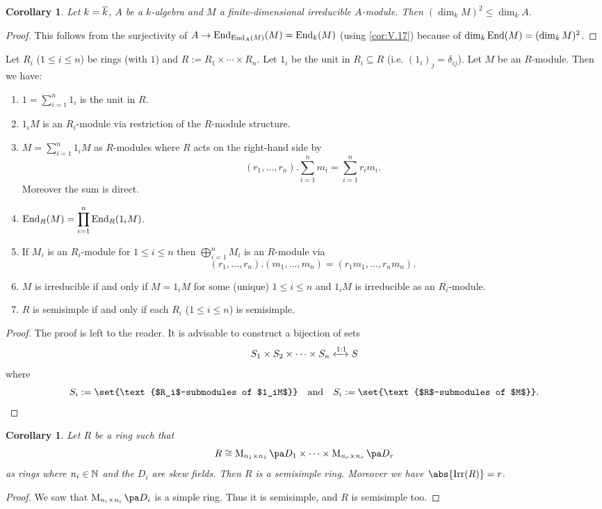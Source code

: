 \documentclass[12pt,a4paper]{scrartcl}
\theoremstyle{cplain}
\newtheorem{cor}[thmcounter]{Corollary}
\theoremstyle{cplain}
\theoremstyle{cplain}
\theoremstyle{definition}
\begin{document}
\begin{otherlanguage}{english}
\begin{cor} %
  Let $k=\overline k$, $A$ be a $k$-algebra and $M$ a finite-dimensional irreducible $A$-module. Then $(\dim_kM)^2 \le \dim_kA$.
\end{cor}
\begin{proof}
  This follows from the surjectivity of $A \to \operatorname{End}_{\operatorname{End}_{A}(M)}(M) = \operatorname{End}_k(M)$ (using \cref{cor:V.17}) because of $\dim_k\operatorname{End}(M) = (\dim_kM)^2$.
\end{proof}


\begin{lem} \label{lem:V.19} %
  Let $R_i$ ($1\le i\le n$) be rings (with $1$) and $R := R_1 \times \cdots \times R_n$. Let $1_i$ be the unit in $R_i \subseteq R$ (i.e. $(1_i)_j = \delta_{ij}$). Let $M$ be an $R$-module. Then we have:
  \begin{enumerate}
    \item $1 = \sum_{i=1}^n1_i$ is the unit in $R$.
    \item $1_iM$ is an $R_i$-module via restriction of the $R$-module structure.
    \item $M = \sum_{i=1}^n1_iM$ as $R$-modules where $R$ acts on the right-hand side by \[ (r_1,\ldots,r_n) . \sum_{i=1}^nm_i = \sum_{i=1}^nr_im_i. \] Moreover the sum is direct.
    \item \label{lem:V.19:4} $\displaystyle\operatorname{End}_R(M) = \prod_{i=1}^n \operatorname{End}_R(1_iM)$.
    \item If $M_i$ is an $R_i$-module for $1\le i\le n$ then $\bigoplus_{i=1}^n M_i$ is an $R$-module via \[(r_1,\ldots,r_n).(m_1,\ldots,m_n) = (r_1m_1,\ldots,r_nm_n).\]
    \item \label{lem:V.19:6} $M$ is irreducible if and only if $M = 1_iM$ for some (unique) $1\le i\le n$ and $1_iM$ is irreducible as an $R_i$-module.
    \item $R$ is semisimple if and only if each $R_i$ ($1\le i\le n$) is semisimple.
  \end{enumerate}
\end{lem}
\begin{proof}
  The proof is left to the reader. It is advisable to construct a bijection of sets \[ S_1 \times S_2 \times \cdots \times S_n \xleftrightarrow{1:1} S \] where \[ S_i := \set{\text{$R_i$-submodules of $1_iM$}} \quad\text{and}\quad S_i := \set{\text{$R$-submodules of $M$}}. \qedhere \]
\end{proof}

\newpage

\begin{cor} \label{cor:V.20} %
  Let $R$ be a ring such that \[R \cong \Mat {n_1}{D_1} \times \cdots \times \Mat{n_r}{D_r}\] as rings where $n_i \in \mathbb N$ and the $D_i$ are skew fields. Then $R$ is a semisimple ring. Moreover we have $\abs{\Irr(R)} = r$.
\end{cor}
\begin{proof}
  We saw that $\Mat{n_i}{D_i}$ is a simple ring. Thus it is semisimple, and $R$ is semisimple too.
  

\end{proof}
\end{otherlanguage}
\end{document}
